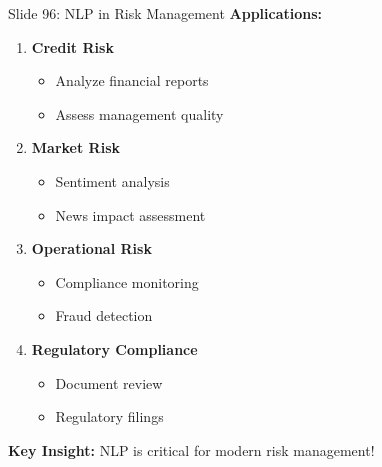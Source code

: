 \documentclass[8pt]{beamer}
\begin{document}
	\begin{frame}{Slide 96: NLP in Risk Management}
		\fontsize{6.5}{7.5}\selectfont
		\textbf{Applications:}
		\begin{enumerate}
			\item \textbf{Credit Risk}
			\begin{itemize}
				\item Analyze financial reports
				\item Assess management quality
			\end{itemize}
			\item \textbf{Market Risk}
			\begin{itemize}
				\item Sentiment analysis
				\item News impact assessment
			\end{itemize}
			\item \textbf{Operational Risk}
			\begin{itemize}
				\item Compliance monitoring
				\item Fraud detection
			\end{itemize}
			\item \textbf{Regulatory Compliance}
			\begin{itemize}
				\item Document review
				\item Regulatory filings
			\end{itemize}
		\end{enumerate}
		
		\textcolor{myblue}{\textbf{Key Insight:}} NLP is critical for modern risk management!
	\end{frame}
	
\end{document}
